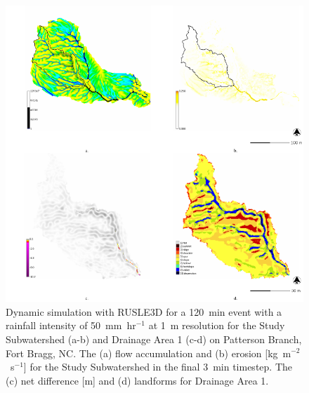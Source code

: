 \documentclass[gmd, manuscript]{copernicus}
\begin{document}
\begin{figure}
\center
\includegraphics[width=\textwidth,height=0.925\textheight,keepaspectratio]{figures/rusle.pdf}
\caption{Dynamic simulation with RUSLE3D 
for a 120~\unit{min} event 
with a rainfall intensity of 50~\unit{mm~hr}$^{-1}$
at 1~\unit{m} resolution for
the Study Subwatershed (a-b)
and Drainage Area 1 (c-d)
on Patterson Branch, Fort Bragg, NC.
The (a) flow accumulation  and
(b) erosion [\unit{kg~m}$^{-2}$~\unit{s}$^{-1}$]
for the Study Subwatershed in the final 3~\unit{min} timestep.
The (c) net difference [\unit{m}] and (d) landforms 
for Drainage Area 1.
}
\label{fig:rusle_simulation}
\end{figure}
\end{document}

